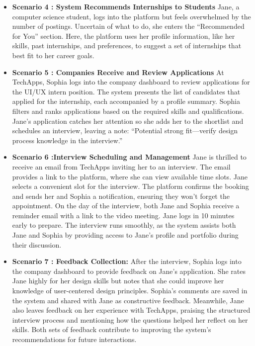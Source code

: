 \begin{itemize}
    \item \textbf{Scenario 4 : \textbf{System Recommends Internships to Students} }
Jane, a computer science student, logs into the platform but feels overwhelmed by the number of postings. Uncertain of what to do, she enters the “Recommended for You” section. Here, the platform uses her profile information, like her skills, past internships, and preferences, to suggest a set of internships that best fit to her career goals. 

\item \textbf{Scenario 5 : \textbf{Companies Receive and Review Applications} }
At TechApps, Sophia logs into the company dashboard to review applications for the UI/UX intern position. The system presents the list of candidates that applied for the internship, each accompanied by a profile summary. Sophia filters and ranks applications based on the required skills and qualifications.
Jane’s application catches her attention so she adds her to the shortlist and schedules an interview, leaving a note: “Potential strong fit—verify design process knowledge in the interview.”

\item \textbf{Scenario 6 :\textbf{Interview Scheduling and Management}}
Jane is thrilled to receive an email from TechApps inviting her to an interview. The email provides a link to the platform, where she can view available time slots. Jane selects a convenient slot for the interview. The platform confirms the booking and sends her and Sophia a notification, ensuring they won’t forget the appointment. On the day of the interview, both Jane and Sophia receive a reminder email with a link to the video meeting. Jane logs in 10 minutes early to prepare. The interview runs smoothly, as the system assists both Jane and Sophia by providing access to Jane’s profile and portfolio during their discussion.

\item \textbf{Scenario 7 : Feedback Collection:} 
After the interview, Sophia logs into the company dashboard to provide feedback on Jane’s application. She rates Jane highly for her design skills but notes that she could improve her knowledge of user-centered design principles. Sophia’s comments are saved in the system and shared with Jane as constructive feedback. Meanwhile, Jane also leaves feedback on her experience with TechApps, praising the structured interview process and mentioning how the questions helped her reflect on her skills. Both sets of feedback contribute to improving the system’s recommendations for future interactions.
 

\end{itemize}

